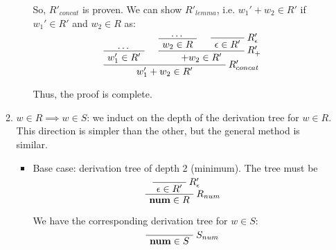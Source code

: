 \begin{exercise}{}
\begin{solution}
\begin{enumerate}
\begin{enumerate}
\begin{itemize}
          So, \(R'_{concat}\) is proven. We can show \(R'_{lemma}\), i.e. \(w_1'
          + w_2 \in R'\) if \(w_1' \in R'\) and \(w_2 \in R\) as:
          \begin{gather*}
            \AxiomC{\ldots}
            \UnaryInfC{\(w_1' \in R'\)}
            \AxiomC{\ldots}
            \UnaryInfC{\(w_2 \in R\)}
            \AxiomC{}
            \RightLabel{\(R'_\epsilon\)}
            \UnaryInfC{\(\epsilon \in R'\)}
            \RightLabel{\(R'_+\)}
            \BinaryInfC{\(+ w_2 \in R'\)}
            \RightLabel{\(R'_{concat}\)}
            \BinaryInfC{\(w_1' + w_2 \in R'\)}
            \DisplayProof
          \end{gather*}

          Thus, the proof is complete.
      \end{itemize}
      \item \(w \in R \implies w \in S\): we induct on the depth of the
      derivation tree for \(w \in R\). This direction is simpler than the other,
      but the general method is similar.
      
      \begin{itemize}
        \item Base case: derivation tree of depth 2 (minimum). The tree must be
        \begin{gather*}
          \AxiomC{}
          \RightLabel{\(R'_{\epsilon}\)}
          \UnaryInfC{\(\epsilon \in R'\)}
          \RightLabel{\(R_{num}\)}
          \UnaryInfC{\(\num \in R\)}
          \DisplayProof
        \end{gather*}
  
        We have the corresponding derivation tree for \(w \in S\):
        \begin{gather*}
          \AxiomC{}
          \RightLabel{\(S_{num}\)}
          \UnaryInfC{\(\num \in S\)}
          \DisplayProof
        \end{gather*}
  

\end{itemize}
\end{enumerate}
\end{enumerate}
\end{solution}
\end{exercise}

